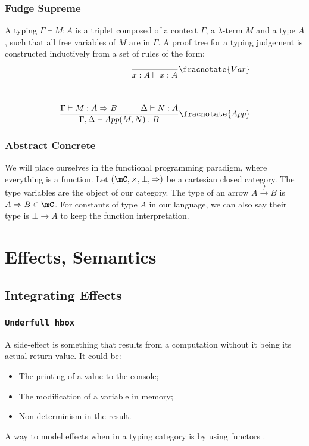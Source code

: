 \documentclass[math, english, info, noamsthm]{beamercours}
\begin{document}
\begin{frame}
	\frametitle{Fudge Supreme}
	\begin{definition}
		A typing $\Gamma\vdash M: A$ is a triplet composed of a context $\Gamma$, a $\lambda$-term $M$ and a type $A$, such that all free variables of $M$ are in $\Gamma$.
		A proof tree for a typing judgement is constructed inductively from a set of rules of the form:
		\begin{align*}
			\frac{}{x:A \vdash x:A}\fracnotate{Var} \\[1cm]
			\frac{\Gamma\vdash M:A \Rightarrow B \hspace{1cm} \Delta \vdash N:A}{\Gamma, \Delta\vdash App(M, N):B}\fracnotate{App}
		\end{align*}
	\end{definition}
\end{frame}

\begin{frame}
	\frametitle{Abstract Concrete}
	We will place ourselves in the functional programming paradigm, where everything is a function.
	Let $\left(\mC, \times, \bot, \Rightarrow\right)$ be a cartesian closed category. The type variables are the object of our category.\pause
	The type of an arrow $A \xrightarrow{f} B$ is $A \Rightarrow B \in \mC$.
	For constants of type $A$ in our language, we can also say their type is $\bot \to A$ to keep the function interpretation.
\end{frame}

\section{Effects, Semantics}
\subsection{Integrating Effects}
\begin{frame}
	\frametitle{\texttt{Underfull hbox}}
	A side-effect is something that results from a computation without it being its actual return value. It could be:\pause
	\begin{itemize}
		\item The printing of a value to the console; \pause
		\item The modification of a variable in memory; \pause
		\item Non-determinism in the result.
	\end{itemize}
	\pause
	A way to model effects when in a typing category is by using functors \cite{moggiComputationalLambdacalculusMonads1989}.
\end{frame}
\end{document}
